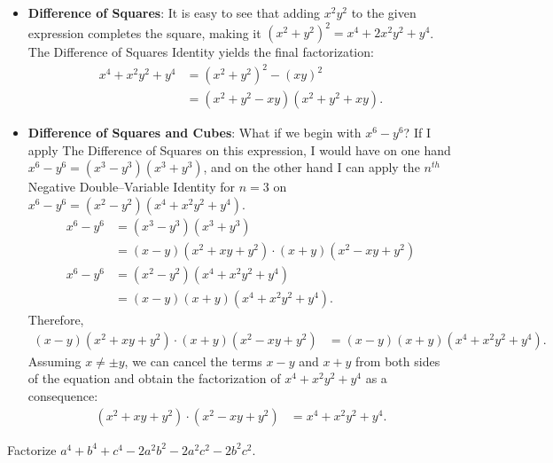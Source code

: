 \documentclass[12pt,a4paper]{memoir}
\theoremstyle{definition}
\begin{document}
	\begin{solution}[name=Solution by Sophie Parker]
		
		\begin{itemize}
			\item \textbf{Difference of Squares}: It is easy to see that adding $x^2y^2$ to the given expression completes the square, making it
			$(x^2+y^2)^2 = x^4+2x^2y^2+y^4$. The Difference of Squares Identity yields the final factorization:
			\begin{align*}
				x^4+x^2y^2+y^4 &= (x^2+y^2)^2 - (xy)^2\\ &=(x^2+y^2-xy)(x^2+y^2+xy).
			\end{align*}
			
			\item \textbf{Difference of Squares and Cubes}: What if we begin with $x^6-y^6$? If I apply The Difference of Squares on this expression, I would have on one hand $x^6-y^6=(x^3-y^3)(x^3+y^3)$, and on the other hand I can apply the $n^{th}$ Negative Double--Variable Identity for $n=3$ on $x^6-y^6= (x^2-y^2)(x^4+x^2y^2+y^4)$.
			\begin{align*}
				x^6 - y^6 &= (x^3-y^3)(x^3+y^3)\\
				&= (x-y)(x^2+xy+y^2)\cdot (x+y)(x^2-xy+y^2)\\
				x^6 - y^6 &= (x^2-y^2)(x^4+x^2y^2+y^4)\\
				&= (x-y)(x+y)(x^4+x^2y^2+y^4).
			\end{align*}
			Therefore,
			\begin{align*}
				(x-y)(x^2+xy+y^2)\cdot (x+y)(x^2-xy+y^2) &= (x-y)(x+y)(x^4+x^2y^2+y^4).
			\end{align*}
			Assuming $x\neq \pm y$, we can cancel the terms $x-y$ and $x+y$ from both sides of the equation and obtain the factorization of $x^4+x^2y^2+y^4$ as a consequence:
			\begin{align*}
				(x^2+xy+y^2)\cdot(x^2-xy+y^2) &= x^4+x^2y^2+y^4.
			\end{align*}
		\end{itemize}
	\end{solution}
	
	
	

	
	
	
	
	
	
	\setcounter{question}{71}	
	
	
	
	\begin{tcolorbox}
		\begin{question}
			Factorize $a^4+b^4+c^4 - 2a^2b^2 - 2a^2c^2 - 2b^2c^2$.
		\end{question}
	\end{tcolorbox}
	
\end{document}
